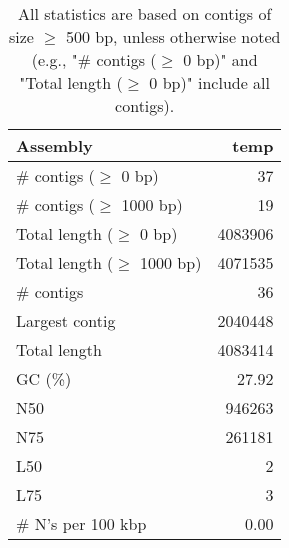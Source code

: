 \documentclass[12pt,a4paper]{article}
\begin{document}
\begin{table}[ht]
\begin{center}
\caption{All statistics are based on contigs of size $\geq$ 500 bp, unless otherwise noted (e.g., "\# contigs ($\geq$ 0 bp)" and "Total length ($\geq$ 0 bp)" include all contigs).}
\begin{tabular}{|l*{1}{|r}|}
\hline
Assembly & temp \\ \hline
\# contigs ($\geq$ 0 bp) & 37 \\ \hline
\# contigs ($\geq$ 1000 bp) & 19 \\ \hline
Total length ($\geq$ 0 bp) & 4083906 \\ \hline
Total length ($\geq$ 1000 bp) & 4071535 \\ \hline
\# contigs & 36 \\ \hline
Largest contig & 2040448 \\ \hline
Total length & 4083414 \\ \hline
GC (\%) & 27.92 \\ \hline
N50 & 946263 \\ \hline
N75 & 261181 \\ \hline
L50 & 2 \\ \hline
L75 & 3 \\ \hline
\# N's per 100 kbp & 0.00 \\ \hline
\end{tabular}
\end{center}
\end{table}
\end{document}
